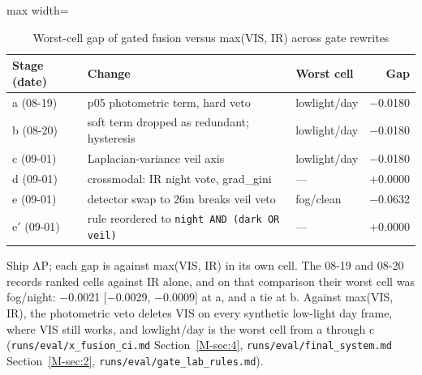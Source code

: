 \documentclass[journal,onecolumn]{IEEEtran}
\begin{document}
\begin{table}[htbp]
\centering
\small
\caption{Worst-cell gap of gated fusion versus max(VIS, IR) across gate rewrites}
\label{tab:6}
\begin{adjustbox}{max width=\linewidth}
\begin{tabular}{lllr}
\toprule
Stage (date) & Change & Worst cell & Gap \\
\midrule
a (08-19) & p05 photometric term, hard veto & lowlight/day & $-$0.0180 \\
b (08-20) & soft term dropped as redundant; hysteresis & lowlight/day & $-$0.0180 \\
c (09-01) & Laplacian-variance veil axis & lowlight/day & $-$0.0180 \\
d (09-01) & crossmodal: IR night vote, grad\_gini & --- & +0.0000 \\
e (09-01) & detector swap to 26m breaks veil veto & fog/clean & $-$0.0632 \\
e$'$ (09-01) & rule reordered to \texttt{night AND (dark OR veil)} & --- & +0.0000 \\
\bottomrule
\end{tabular}
\end{adjustbox}
\par\smallskip\raggedright\footnotesize Ship AP; each gap is against max(VIS, IR) in its own cell. The 08-19 and 08-20 records ranked cells against IR alone, and on that comparison their worst cell was fog/night: $-$0.0021 [$-$0.0029, $-$0.0009] at a, and a tie at b. Against max(VIS, IR), the photometric veto deletes VIS on every synthetic low-light day frame, where VIS still works, and lowlight/day is the worst cell from a through c (\texttt{runs/\allowbreak{}eval/\allowbreak{}x\_\allowbreak{}fusion\_\allowbreak{}ci.md} Section~\ref{M-sec:4}, \texttt{runs/\allowbreak{}eval/\allowbreak{}final\_\allowbreak{}system.md} Section~\ref{M-sec:2}, \texttt{runs/\allowbreak{}eval/\allowbreak{}gate\_\allowbreak{}lab\_\allowbreak{}rules.md}).
\end{table}
\end{document}
